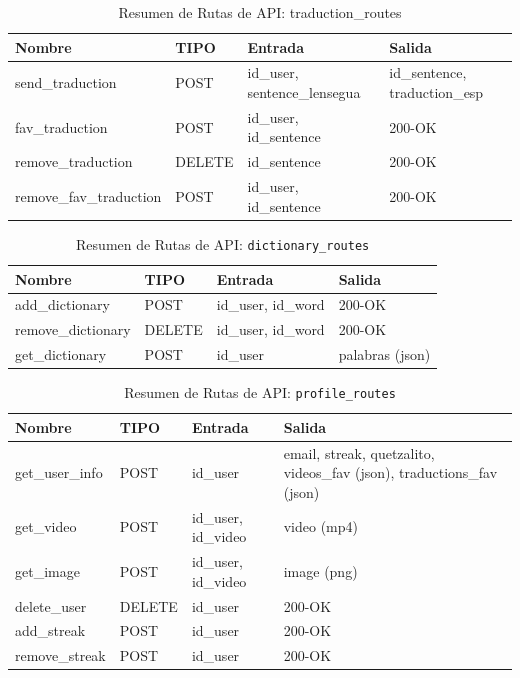 \begin{table}[H]
\centering
\begin{tabularx}{\textwidth}{|l|l|l|X|}
\hline
\rowcolor{blue!30} \textbf{Nombre} & \textbf{TIPO} & \textbf{Entrada} & \textbf{Salida} \\ \hline
send\_traduction & POST & id\_user, sentence\_lensegua & id\_sentence, traduction\_esp \\ \hline
fav\_traduction & POST & id\_user, id\_sentence & 200-OK \\ \hline
remove\_traduction & DELETE & id\_sentence & 200-OK \\ \hline
remove\_fav\_traduction & POST & id\_user, id\_sentence & 200-OK \\ \hline
\end{tabularx}
\caption{Resumen de Rutas de API: traduction\_routes}
\label{tab:traduction_routes}
\end{table}

\begin{table}[H]
\centering
\begin{tabularx}{\textwidth}{|l|l|l|X|}
\hline
\textbf{Nombre} & \textbf{TIPO} & \textbf{Entrada} & \textbf{Salida} \\ \hline
add\_dictionary & POST & id\_user, id\_word & 200-OK \\ \hline
remove\_dictionary & DELETE & id\_user, id\_word & 200-OK \\ \hline
get\_dictionary & POST & id\_user & palabras (json) \\ \hline
\end{tabularx}
\caption{Resumen de Rutas de API: \texttt{dictionary\_routes}}
\label{tab:dictionary_routes}
\end{table}

\begin{table}[H]
\centering
\begin{tabularx}{\textwidth}{|l|l|l|X|}
\hline
\textbf{Nombre} & \textbf{TIPO} & \textbf{Entrada} & \textbf{Salida} \\ \hline
get\_user\_info & POST & id\_user & email, streak, quetzalito, videos\_fav (json), traductions\_fav (json) \\ \hline
get\_video & POST & id\_user, id\_video & video (mp4) \\ \hline
get\_image & POST & id\_user, id\_video & image (png) \\ \hline
delete\_user & DELETE & id\_user & 200-OK \\ \hline
add\_streak & POST & id\_user & 200-OK \\ \hline
remove\_streak & POST & id\_user & 200-OK \\ \hline
\end{tabularx}
\caption{Resumen de Rutas de API: \texttt{profile\_routes}}
\label{tab:profile_routes}
\end{table}

